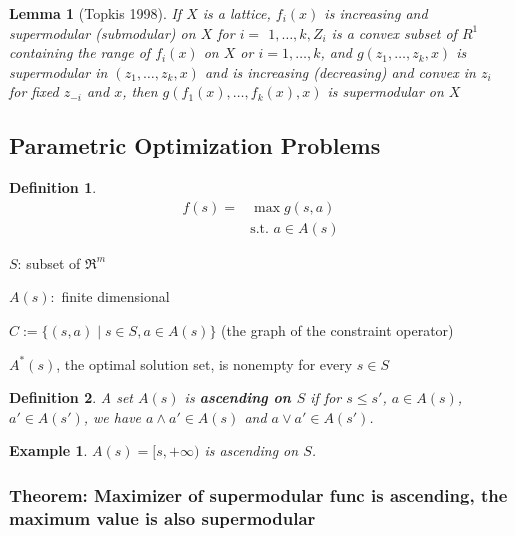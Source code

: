 \documentclass[11pt,a4paper]{article}
\newtheorem{definition}{Definition}
\newtheorem{lemma}{Lemma}
\newtheorem{example}{Example}
\begin{document}
\begin{lemma}[Topkis 1998]
    If $X$ is a lattice, $f_{i}(x)$ is increasing and supermodular (submodular) on $X$ for $i=$ $1, \ldots, k, Z_{i}$ is a convex subset of $R^{1}$ containing the range of $f_{i}(x)$ on $X$ or $i=1, \ldots, k$, and $g\left(z_{1}, \ldots, z_{k}, x\right)$ is supermodular in $\left(z_{1}, \ldots, z_{k}, x\right)$ and is increasing (decreasing) and convex in $z_{i}$ for fixed $z_{-i}$ and $x$, then $g\left(f_{1}(x), \ldots, f_{k}(x), x\right)$
is supermodular on $X$
\end{lemma}

\subsection{Parametric Optimization Problems}
\begin{definition}
    \begin{align*}
        f(s)=&\max g(s,a)\\
        &\text{s.t. }a\in A(s)
    \end{align*}
\end{definition}
$S$: subset of $\mathfrak{R}^{m}$
    
$A(s):$ finite dimensional

$C:=\{(s, a) \mid s \in S, a \in A(s)\}$ (the graph of the constraint operator)

$A^{*}(s)$, the optimal solution set, is nonempty for every $s \in S$

\begin{definition}
A set $A(s)$ is \textbf{ascending on $S$} if for $s\leq s'$, $a\in A(s)$, $a'\in A(s')$, we have $a\wedge a'\in A(s)$ and $a\vee a'\in A(s')$.
\end{definition}

\begin{example}
$A(s)=[s,+\infty)$ is ascending on $S$.
\end{example}




\subsubsection{Theorem: Maximizer of supermodular func is ascending, the maximum value is also supermodular}
\end{document}
